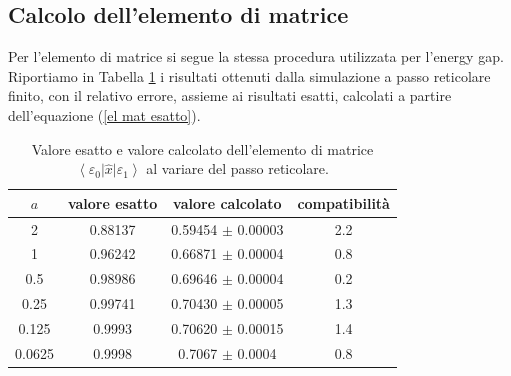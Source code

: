 \documentclass{article}
\begin{document}
\subsection{Calcolo dell'elemento di matrice}
Per l'elemento di matrice si segue la stessa procedura utilizzata per l'energy gap. Riportiamo in Tabella \ref{tabella matrix simulate} i risultati ottenuti dalla simulazione a passo reticolare finito, con il relativo errore, assieme ai risultati esatti, calcolati a partire dell'equazione (\ref{el mat esatto}).
\begin{table}[h]
    \centering
    \begin{tabular}{||c c c c||} 
     \hline
     $a$ & valore esatto & valore calcolato & compatibilità\\[0.5ex] 
     \hline\hline
     2      & 0.88137  & 0.59454  $\pm$ 0.00003 & 2.2 \\
     1      & 0.96242  & 0.66871 $\pm$ 0.00004 & 0.8 \\
     0.5    & 0.98986  & 0.69646 $\pm$ 0.00004 & 0.2 \\
     0.25   & 0.99741  & 0.70430  $\pm$ 0.00005 & 1.3 \\
     0.125  & 0.9993  & 0.70620 $\pm$ 0.00015 & 1.4 \\
     0.0625 & 0.9998  & 0.7067 $\pm$ 0.0004 & 0.8 \\[1ex] 
     \hline
    \end{tabular}
    \caption{Valore esatto e valore calcolato dell'elemento di matrice $\left<\varepsilon_0\right|\hat{x}\left|\varepsilon_1\right>$ al variare del passo reticolare.}
    \label{tabella matrix simulate}
\end{table}
\end{document}
